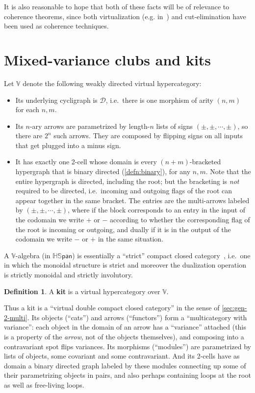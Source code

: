 \documentclass{article}
\theoremstyle{definition}
\newtheorem{defn}[thm]{Definition}
\theoremstyle{remark}
\def\hspan{\mathbb{HS}\mathsf{pan}}
\def\dhy{\mathcal{D}}
\def\vhy{\mathbb{V}}
\begin{document}
It is also reasonable to hope that both of these facts will be of relevance to coherence theorems, since both virtualization (e.g. in~\cite{hermida:coh-univ}) and cut-elimination have been used as coherence techniques.


\section{Mixed-variance clubs and kits}
\label{sec:kits}

Let $\vhy$ denote the following weakly directed virtual hypercategory:
\begin{itemize}
\item Its underlying cycligraph is $\dhy$, i.e.\ there is one morphism of arity $(n,m)$ for each $n,m$.
\item Its $n$-ary arrows are parametrized by length-$n$ lists of signs $(\pm,\pm,\cdots,\pm)$, so there are $2^n$ such arrows.
  They are composed by flipping signs on all inputs that get plugged into a minus sign.
\item It has exactly one 2-cell whose domain is every $(n+m)$-bracketed hypergraph that is binary directed (\cref{defn:binary}), for any $n,m$.
  Note that the entire hypergraph is directed, including the root; but the bracketing is \emph{not} required to be directed, i.e.\ incoming and outgoing flags of the root can appear together in the same bracket.
  The entries are the multi-arrows labeled by $(\pm,\pm,\cdots,\pm)$, where if the block corresponds to an entry in the input of the codomain we write $+$ or $-$ according to whether the corresponding flag of the root is incoming or outgoing, and dually if it is in the output of the codomain we write $-$ or $+$ in the same situation.
\end{itemize}

A $\vhy$-algebra (in $\hspan$) is essentially a ``strict'' compact closed category~\cite{kl:cpt}, i.e.\ one in which the monoidal structure is strict and moreover the dualization operation is strictly monoidal and strictly involutory.

\begin{defn}
  A \textbf{kit} is a virtual hypercategory over $\vhy$.
\end{defn}

Thus a kit is a  ``virtual double compact closed category'' in the sense of \cref{sec:gen-2-multi}.
Its objects (``cats'') and arrows (``functors'') form a ``multicategory with variance'': each object in the domain of an arrow has a ``variance'' attached (this is a property of the \emph{arrow}, not of the objects themselves), and composing into a contravariant spot flips variances.
Its morphisms (``modules'') are parametrized by lists of objects, some covariant and some contravariant.
And its 2-cells have as domain a binary directed graph labeled by these modules connecting up some of their parametrizing objects in pairs, and also perhaps containing loops at the root as well as free-living loops.
\end{document}
